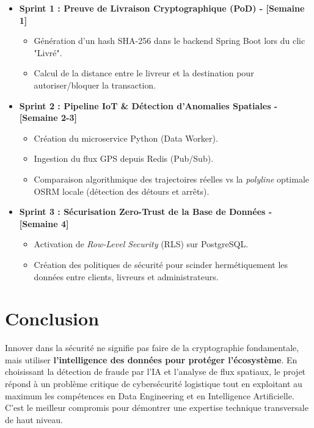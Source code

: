 \documentclass[11pt,a4paper]{article}
\begin{document}
\begin{itemize}
    \item \textbf{Sprint 1 : Preuve de Livraison Cryptographique (PoD) - [Semaine 1]}
    \begin{itemize}
        \item Génération d'un hash SHA-256 dans le backend Spring Boot lors du clic "Livré".
        \item Calcul de la distance entre le livreur et la destination pour autoriser/bloquer la transaction.
    \end{itemize}
    \item \textbf{Sprint 2 : Pipeline IoT \& Détection d'Anomalies Spatiales - [Semaine 2-3]}
    \begin{itemize}
        \item Création du microservice Python (Data Worker).
        \item Ingestion du flux GPS depuis Redis (Pub/Sub).
        \item Comparaison algorithmique des trajectoires réelles vs la \textit{polyline} optimale OSRM locale (détection des détours et arrêts).
    \end{itemize}
    \item \textbf{Sprint 3 : Sécurisation Zero-Trust de la Base de Données - [Semaine 4]}
    \begin{itemize}
        \item Activation de \textit{Row-Level Security} (RLS) sur PostgreSQL.
        \item Création des politiques de sécurité pour scinder hermétiquement les données entre clients, livreurs et administrateurs.
    \end{itemize}
\end{itemize}

\section*{Conclusion}
Innover dans la sécurité ne signifie pas faire de la cryptographie fondamentale, mais utiliser \textbf{l'intelligence des données pour protéger l'écosystème}. En choisissant la détection de fraude par l'IA et l'analyse de flux spatiaux, le projet répond à un problème critique de cybersécurité logistique tout en exploitant au maximum les compétences en Data Engineering et en Intelligence Artificielle. C'est le meilleur compromis pour démontrer une expertise technique transversale de haut niveau.
\end{document}
